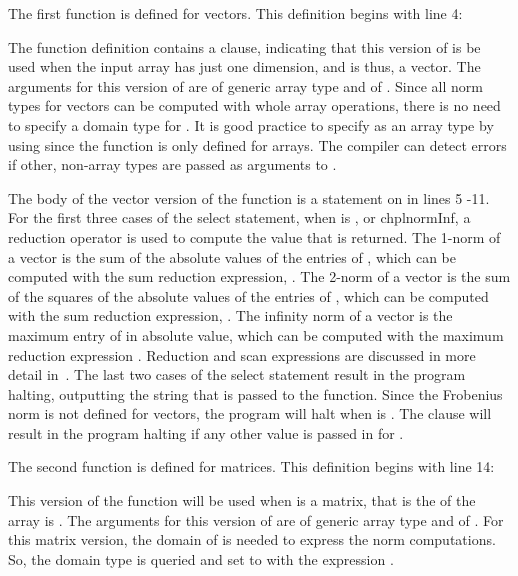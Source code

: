 The first  function is defined for vectors.  This definition
begins with line 4:
\begin{chapel}
  def norm(x: [], p: normType) where x.rank == 1 {
\end{chapel}
The function definition contains a  clause, indicating that
this version of  is be used when the input array 
has just one dimension, and is thus, a vector.  The arguments for this version
of  are  of generic array type and  of .  
Since all norm types for vectors can be computed with whole array operations, there 
is no need to specify a domain type for .  It is good practice to
specify  as an array type by using \chpl{: []} since the 
function is only defined for arrays.  The compiler can detect errors if other,
non-array types are passed as arguments to .


The body of the vector version of the  function is a  statement on
 in lines 5 -11.  For the first three cases of the select statement,
when  is ,  or chpl{normInf},
a reduction operator is used to compute the value that is returned. 
The 1-norm of a vector is the sum of the absolute values of the entries of ,
which can be computed with the sum reduction expression, .
The 2-norm of a vector is the sum of the squares of the absolute values of
the entries of , which can be computed with the sum reduction expression,
.
The infinity norm of a vector is the maximum entry of  in absolute value,
which can be computed with the maximum reduction expression .
Reduction and scan expressions are discussed in more detail 
in~.  The last two cases of the select statement result
in the program halting, outputting the string that is passed to the 
function.  Since the Frobenius norm is not defined for vectors, the program
will halt when  is .  The  clause will
result in the program halting if any other value is passed in for .

The second  function is defined for matrices.  This definition begins
with line 14:
\begin{chapel}
  def norm(x: [?D], p: normType) where x.rank == 2 {
\end{chapel}
This version of the function will be used when  is a matrix,
that is the  of the array  is .  The arguments
for this version of  are  of generic array type and 
of .  For this matrix version, the domain of  is
needed to express the  norm computations.  So, the domain type is queried and set to 
 with the expression \chpl{[?D]}.  

